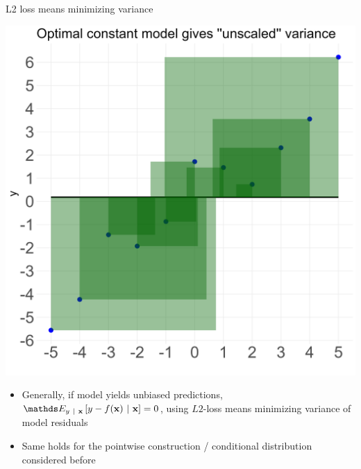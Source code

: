 \documentclass[11pt,compress,t,notes=noshow, xcolor=table]{beamer}
\begin{document}
\begin{vbframe}{L2 loss means minimizing variance}
\begin{minipage}{0.5\textwidth}
    \centering
    \includegraphics[width=0.9\linewidth]{figure_man/plot_const_var.png}
\end{minipage}%
\begin{minipage}{0.5\textwidth}
    \begin{itemize}
    \small
        \item  Generally, if model yields unbiased predictions, { $\E_{y~|~\xv}\left[y-\fx~|~\xv\right]=0$}, using $L2$-loss means minimizing variance of model residuals
        \item Same holds for the pointwise construction / conditional distribution considered before
     \end{itemize}
\end{minipage}




\end{vbframe}
\end{document}
